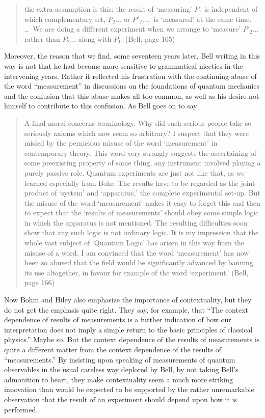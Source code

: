 \documentclass[12pt]{article}
\newcommand\bq{\begin{quotation}}
\newcommand\eq{\end{quotation}}
\begin{document}
\bq \noindent the extra assumption is this: the result of `measuring' $P_1$
is independent of which complementary set, $P_2\dots$ or  $P'_2\dots,$ is
`measured' at the same time. \dots\  We are doing a different experiment when
we arrange to  `measure' $P'_2\dots$ rather than $P_2\dots$  along with
$P_1$. (Bell, page 165)
\eq
Moreover, the reason that we find, some seventeen years later, Bell writing in
this way is not that he had become more sensitive to grammatical niceties
in the intervening years. Rather it reflected his frustration with the
continuing abuse of the word ``measurement'' in discussions on the
foundations of  quantum mechanics and the confusion that this abuse makes
all too common, as well as his desire not himself to contribute to this
confusion. As Bell goes on to say

\bq A final moral concerns terminology. Why did such serious people take so
seriously axioms which now seem so arbitrary? I suspect that they were
misled by the pernicious misuse of the word `measurement' in contemporary
theory. This word very strongly suggests the ascertaining of some
preexisting property of some thing, any instrument involved playing a
purely passive role. Quantum experiments are just not like that, as we
learned especially from Bohr. The results have to be regarded as the joint
product of `system' and `apparatus,' the complete experimental set-up. But
the misuse of the word `measurement' makes it easy to forget this and then
to expect that the `results of measurements' should obey some simple logic
in which the apparatus is not mentioned. The resulting difficulties soon
show that any such logic is not ordinary logic.  It is my impression that
the whole vast subject of `Quantum Logic' has arisen in this way from the
misuse of a word. I am convinced that the word `measurement' has now been
so abused that the field would be significantly advanced by banning its use
altogether, in favour for example of the word `experiment.' (Bell, page 166)
\eq

Now Bohm and Hiley also emphasize the importance of contextuality, but they
do not get the emphasis quite right. They say, for example, that ``The
context dependence of results of measurements is a further indication of
how our interpretation does not imply a simple return to the basic
principles of classical physics.'' Maybe so. But the context dependence of
the results of measurements is quite a different matter from the context
dependence of the results of ``measurements.'' By insisting upon speaking
of measurements of quantum observables in the usual careless way deplored
by Bell, by not taking Bell's admonition to heart, they make contextuality
seem a much more striking innovation than  would be expected to be
supported by the rather unremarkable observation that the result of an
experiment should depend upon how it is performed.
\end{document}
